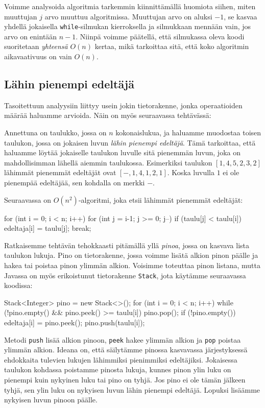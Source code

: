 Voimme analysoida algoritmia tarkemmin kiinnittämällä huomiota
siihen, miten muuttujan $j$ arvo muuttuu algoritmissa.
Muuttujan arvo on aluksi $-1$,
se kasvaa yhdellä jokaisella \texttt{while}-silmukan kierroksella
ja silmukkaan mennään vain, jos arvo on enintään $n-1$.
Niinpä voimme päätellä, että silmukassa oleva koodi suoritetaan \emph{yhteensä}
$O(n)$ kertaa, mikä tarkoittaa sitä,
että koko algoritmin aikavaativuus on vain $O(n)$.

\subsection{Lähin pienempi edeltäjä}

Tasoitettuun analyysiin liittyy usein jokin tietorakenne,
jonka operaatioiden määrää haluamme arvioida.
Näin on myös seuraavassa tehtävässä:

Annettuna on taulukko, jossa on $n$ kokonaislukua,
ja haluamme muodostaa toisen taulukon,
jossa on jokaisen luvun \emph{lähin pienempi edeltäjä}.
Tämä tarkoittaa, että haluamme löytää jokaiselle taulukon luvulle
sitä pienemmän luvun, joka on mahdollisimman lähellä aiemmin taulukossa.
Esimerkiksi taulukon $[1,4,5,2,3,2]$
lähimmät pienemmät edeltäjät ovat $[-,1,4,1,2,1]$.
Koska luvulla $1$ ei ole pienempää edeltäjää,
sen kohdalla on merkki $-$.

Seuraavassa on $O(n^2)$-algoritmi, joka etsii
lähimmät pienemmät edeltäjät:

\begin{code}
for (int i = 0; i < n; i++) {
    for (int j = i-1; j >= 0; j--) {
        if (taulu[j] < taulu[i]) {
            edeltaja[i] = taulu[j];
            break;
        }
    }
}
\end{code}

Ratkaisemme tehtävän tehokkaasti pitämällä yllä \emph{pinoa},
jossa on kasvava lista taulukon lukuja.
Pino on tietorakenne, jossa voimme lisätä alkion pinon päälle
ja hakea tai poistaa pinon ylimmän alkion.
Voisimme toteuttaa pinon listana,
mutta Javassa on myös erikoistunut tietorakenne \texttt{Stack},
jota käytämme seuraavassa koodissa:

\begin{code}
Stack<Integer> pino = new Stack<>();
for (int i = 0; i < n; i++) {
    while (!pino.empty() && pino.peek() >= taulu[i]) {
        pino.pop();
    }
    if (!pino.empty()) {
        edeltaja[i] = pino.peek();
    }
    pino.push(taulu[i]);
}
\end{code}

Metodi \texttt{push} lisää alkion pinoon,
\texttt{peek} hakee ylimmän alkion ja \texttt{pop}
poistaa ylimmän alkion.
Ideana on, että säilytämme pinossa kasvavassa järjestyk\-sessä
ehdokkaita tulevien lukujen lähimmiksi pienimmiksi edeltäjiksi.
Jokaisessa taulukon kohdassa poistamme
pinosta lukuja, kunnes pinon ylin luku on pienempi kuin nykyinen luku
tai pino on tyhjä.
Jos pino ei ole tämän jälkeen tyhjä, sen ylin luku on nykyisen luvun
lähin pienempi edeltäjä.
Lopuksi lisäämme nykyisen luvun pinoon päälle.

